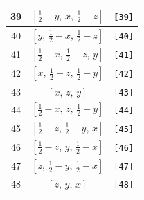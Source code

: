 \documentclass[fleqn,8pt]{jsarticle}
\begin{document}
\begin{longtable}{ccc}
39 & $\left[ \frac{1}{2} - y,\, x,\, \frac{1}{2} - z \right]$ & {\tt [39]} \\ \hline
40 & $\left[ y,\, \frac{1}{2} - x,\, \frac{1}{2} - z \right]$ & {\tt [40]} \\ \hline
41 & $\left[ \frac{1}{2} - x,\, \frac{1}{2} - z,\, y \right]$ & {\tt [41]} \\ \hline
42 & $\left[ x,\, \frac{1}{2} - z,\, \frac{1}{2} - y \right]$ & {\tt [42]} \\ \hline
43 & $\left[ x,\, z,\, y \right]$ & {\tt [43]} \\ \hline
44 & $\left[ \frac{1}{2} - x,\, z,\, \frac{1}{2} - y \right]$ & {\tt [44]} \\ \hline
45 & $\left[ \frac{1}{2} - z,\, \frac{1}{2} - y,\, x \right]$ & {\tt [45]} \\ \hline
46 & $\left[ \frac{1}{2} - z,\, y,\, \frac{1}{2} - x \right]$ & {\tt [46]} \\ \hline
47 & $\left[ z,\, \frac{1}{2} - y,\, \frac{1}{2} - x \right]$ & {\tt [47]} \\ \hline
48 & $\left[ z,\, y,\, x \right]$ & {\tt [48]} \\
\end{longtable}
\end{document}
